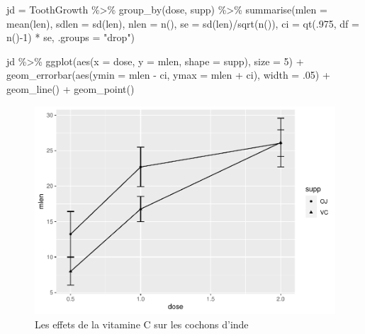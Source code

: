 \documentclass[
]{book}
\newenvironment{Shaded}{}{}
\newcommand{\AttributeTok}[1]{#1}
\newcommand{\DecValTok}[1]{#1}
\newcommand{\FunctionTok}[1]{#1}
\newcommand{\NormalTok}[1]{#1}
\newcommand{\OtherTok}[1]{#1}
\newcommand{\SpecialCharTok}[1]{#1}
\newcommand{\StringTok}[1]{#1}
\begin{document}
\begin{Shaded}
\begin{Highlighting}[]
\NormalTok{jd }\OtherTok{=}\NormalTok{ ToothGrowth }\SpecialCharTok{\%\textgreater{}\%} 
  \FunctionTok{group\_by}\NormalTok{(dose, supp) }\SpecialCharTok{\%\textgreater{}\%} 
  \FunctionTok{summarise}\NormalTok{(}\AttributeTok{mlen =} \FunctionTok{mean}\NormalTok{(len),}
            \AttributeTok{sdlen =} \FunctionTok{sd}\NormalTok{(len),}
            \AttributeTok{nlen =} \FunctionTok{n}\NormalTok{(), }
            \AttributeTok{se =} \FunctionTok{sd}\NormalTok{(len)}\SpecialCharTok{/}\FunctionTok{sqrt}\NormalTok{(}\FunctionTok{n}\NormalTok{()), }
            \AttributeTok{ci =} \FunctionTok{qt}\NormalTok{(.}\DecValTok{975}\NormalTok{, }\AttributeTok{df =} \FunctionTok{n}\NormalTok{()}\SpecialCharTok{{-}}\DecValTok{1}\NormalTok{) }\SpecialCharTok{*}\NormalTok{ se,}
            \AttributeTok{.groups =} \StringTok{"drop"}\NormalTok{)}

\NormalTok{jd }\SpecialCharTok{\%\textgreater{}\%} 
  \FunctionTok{ggplot}\NormalTok{(}\FunctionTok{aes}\NormalTok{(}\AttributeTok{x =}\NormalTok{ dose,}
             \AttributeTok{y =}\NormalTok{ mlen, }
             \AttributeTok{shape =}\NormalTok{ supp),}
         \AttributeTok{size =} \DecValTok{5}\NormalTok{) }\SpecialCharTok{+} 
    \FunctionTok{geom\_errorbar}\NormalTok{(}\FunctionTok{aes}\NormalTok{(}\AttributeTok{ymin =}\NormalTok{ mlen }\SpecialCharTok{{-}}\NormalTok{ ci,}
                      \AttributeTok{ymax =}\NormalTok{ mlen }\SpecialCharTok{+}\NormalTok{ ci), }
                  \AttributeTok{width =}\NormalTok{ .}\DecValTok{05}\NormalTok{) }\SpecialCharTok{+}
    \FunctionTok{geom\_line}\NormalTok{() }\SpecialCharTok{+}
    \FunctionTok{geom\_point}\NormalTok{()}
\end{Highlighting}
\end{Shaded}

\begin{figure}

{\centering \includegraphics[width=0.75\linewidth,height=0.75\textheight]{07-Visualiser_files/figure-latex/erreurbar-1} 

}

\caption{Les effets de la vitamine C sur les cochons d'inde}\label{fig:erreurbar}
\end{figure}
\end{document}
